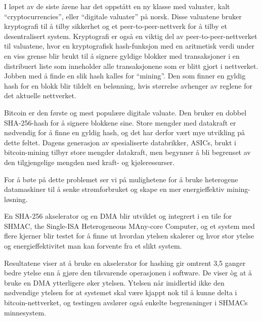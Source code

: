 I løpet av de siste årene har det oppstått en ny klasse med valuater,
kalt ``cryptocurrencies'', eller ``digitale valuater'' på norsk. Disse
valuatene bruker kryptografi til å tilby sikkerhet og et peer-to-peer-nettverk
for å tilby et desentralisert system. Kryptografi er også en viktig del av
peer-to-peer-nettverket til valuatene, hvor en kryptografisk hash-funksjon
med en aritmetisk verdi under en viss grense blir brukt til å signere
gyldige blokker med transaksjoner i en distribuert liste som inneholder
alle transaksjonene som er blitt gjort i nettverket. Jobben med å finde
en slik hash kalles for ``mining''. Den som finner en gyldig hash for en
blokk blir tildelt en belønning, hvis størrelse avhenger av reglene for
det aktuelle nettverket.

Bitcoin er den første og mest populære digitale valuate. Den bruker en
dobbel SHA-256-hash for å signere blokkene sine. Store mengder med
datakraft er nødvendig for å finne en gyldig hash, og det har derfor
vært mye utvikling på dette feltet. Dagens generasjon av spesialiserte
databrikker, ASICs, brukt i bitcoin-mining tilbyr store mengder
datakraft, men begynner å bli begrenset av den tilgjengelige mengden
med kraft- og kjøleressurser.

For å bøte på dette problemet ser vi på mulighetene for å bruke heterogene
datamaskiner til å senke strømforbruket og skape en mer energieffektiv
mining-løsning.

En SHA-256 akselerator og en DMA blir utviklet og integrert i en tile
for SHMAC, the Single-ISA Heterogeneous MAny-core Computer, og et system
med flere kjerner blir testet for å finne ut hvordan ytelsen skalerer
og hvor stor ytelse og energieffektivitet man kan forvente fra et slikt system.


Resultatene viser at å bruke en akselerator for hashing gir omtrent 3,5 ganger
bedre ytelse enn å gjøre den tilsvarende operasjonen i software. De viser òg
at å bruke en DMA ytterligere øker ytelsen. Ytelsen når imidlertid ikke den
nødvendige ytelsen for at systemet skal være kjappt nok til å kunne delta
i bitcoin-nettverket, og testingen avslører også enkelte begrensninger i
SHMACs minnesystem.

